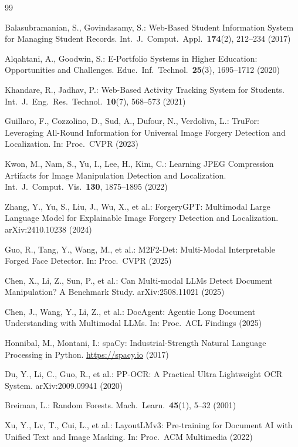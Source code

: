 \documentclass[runningheads]{llncs}
\begin{document}
\begin{thebibliography}{99}

Balasubramanian, S., Govindasamy, S.: Web-Based Student Information System for Managing Student Records. Int.\ J.\ Comput.\ Appl.\ \textbf{174}(2), 212--234 (2017)

Alqahtani, A., Goodwin, S.: E-Portfolio Systems in Higher Education: Opportunities and Challenges. Educ.\ Inf.\ Technol.\ \textbf{25}(3), 1695--1712 (2020)

Khandare, R., Jadhav, P.: Web-Based Activity Tracking System for Students. Int.\ J.\ Eng.\ Res.\ Technol.\ \textbf{10}(7), 568--573 (2021)

Guillaro, F., Cozzolino, D., Sud, A., Dufour, N., Verdoliva, L.: TruFor: Leveraging All-Round Information for Universal Image Forgery Detection and Localization. In: Proc.\ CVPR (2023)

Kwon, M., Nam, S., Yu, I., Lee, H., Kim, C.: Learning JPEG Compression Artifacts for Image Manipulation Detection and Localization. Int.\ J.\ Comput.\ Vis.\ \textbf{130}, 1875--1895 (2022)

Zhang, Y., Yu, S., Liu, J., Wu, X., et al.: ForgeryGPT: Multimodal Large Language Model for Explainable Image Forgery Detection and Localization. arXiv:2410.10238 (2024)

Guo, R., Tang, Y., Wang, M., et al.: M2F2-Det: Multi-Modal Interpretable Forged Face Detector. In: Proc.\ CVPR (2025)

Chen, X., Li, Z., Sun, P., et al.: Can Multi-modal LLMs Detect Document Manipulation? A Benchmark Study. arXiv:2508.11021 (2025)

Chen, J., Wang, Y., Li, Z., et al.: DocAgent: Agentic Long Document Understanding with Multimodal LLMs. In: Proc.\ ACL Findings (2025)

Honnibal, M., Montani, I.: spaCy: Industrial-Strength Natural Language Processing in Python. \url{https://spacy.io} (2017)

Du, Y., Li, C., Guo, R., et al.: PP-OCR: A Practical Ultra Lightweight OCR System. arXiv:2009.09941 (2020)

Breiman, L.: Random Forests. Mach.\ Learn.\ \textbf{45}(1), 5--32 (2001)

Xu, Y., Lv, T., Cui, L., et al.: LayoutLMv3: Pre-training for Document AI with Unified Text and Image Masking. In: Proc.\ ACM Multimedia (2022)


\end{thebibliography}
\end{document}
